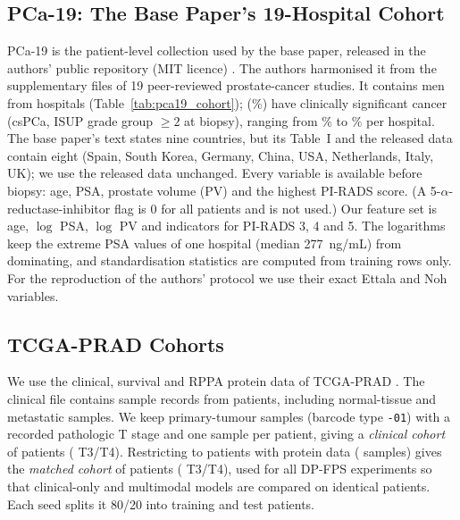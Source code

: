 \documentclass[journal]{IEEEtran}
\begin{document}
\subsection{PCa-19: The Base Paper's 19-Hospital Cohort}
PCa-19 is the patient-level collection used by the base paper, released in the authors' public repository (MIT licence) \cite{Kazlouski2025HospitalParticipation}. The authors harmonised it from the supplementary files of 19 peer-reviewed prostate-cancer studies. It contains \pNineN{} men from \pNineHosp{} hospitals (Table~\ref{tab:pca19_cohort}); \pNinePos{} (\pNinePrev\%) have clinically significant cancer (csPCa, ISUP grade group $\geq 2$ at biopsy), ranging from \pNinePrevLo\% to \pNinePrevHi\% per hospital. The base paper's text states nine countries, but its Table~I and the released data contain eight (Spain, South Korea, Germany, China, USA, Netherlands, Italy, UK); we use the released data unchanged. Every variable is available before biopsy: age, PSA, prostate volume (PV) and the highest PI-RADS score. (A 5-$\alpha$-reductase-inhibitor flag is 0 for all patients and is not used.) Our feature set is age, $\log$ PSA, $\log$ PV and indicators for PI-RADS 3, 4 and 5. The logarithms keep the extreme PSA values of one hospital (median 277~ng/mL) from dominating, and standardisation statistics are computed from training rows only. For the reproduction of the authors' protocol we use their exact Ettala and Noh variables.



\subsection{TCGA-PRAD Cohorts}
We use the clinical, survival and RPPA protein data of TCGA-PRAD \cite{TCGA2015PRAD}. The clinical file contains \nRaw{} sample records from \nRawPatients{} patients, including normal-tissue and metastatic samples. We keep primary-tumour samples (barcode type \texttt{-01}) with a recorded pathologic T stage and one sample per patient, giving a \emph{clinical cohort} of \nClinical{} patients (\nClinicalPos{} T3/T4). Restricting to patients with protein data (\nProteinSamples{} samples) gives the \emph{matched cohort} of \nMatched{} patients (\nMatchedPos{} T3/T4), used for all DP-FPS experiments so that clinical-only and multimodal models are compared on identical patients. Each seed splits it 80/20 into \nTrain{} training and \nTest{} test patients.
\end{document}

